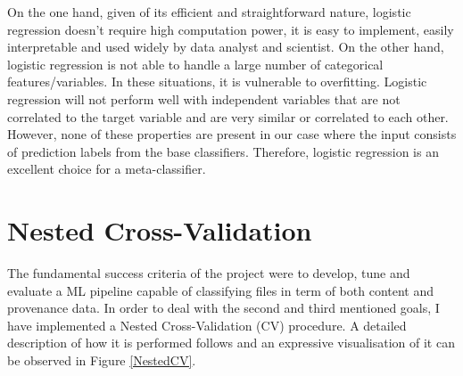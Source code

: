 On the one hand, given of its efficient and straightforward nature, logistic regression doesn't require high computation power, it is easy to implement, easily interpretable and used widely by data analyst and scientist. On the other hand, logistic regression is not able to handle a large number of categorical features/variables. In these situations, it is vulnerable to overfitting. Logistic regression will not perform well with independent variables that are not correlated to the target variable and are very similar or correlated to each other. However, none of these properties are present in our case where the input consists of prediction labels from the base classifiers. Therefore, logistic regression is an excellent choice for a meta-classifier. \\

\section{Nested Cross-Validation} \label{nested_cross_validation}

The fundamental success criteria of the project were to develop, tune and evaluate a ML pipeline capable of classifying files in term of both content and provenance data. In order to deal with the second and third mentioned goals, I have implemented a Nested Cross-Validation (CV) procedure. A detailed description of how it is performed follows and an expressive visualisation of it can be observed in Figure \ref{NestedCV}. \bigskip

